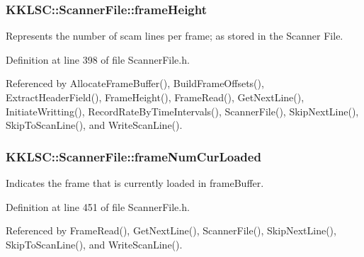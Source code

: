 \subsubsection[{\texorpdfstring{frame\+Height}{frameHeight}}]{ K\+K\+L\+S\+C\+::\+Scanner\+File\+::frame\+Height\hspace{0.3cm}{\ttfamily [protected]}}\hypertarget{class_k_k_l_s_c_1_1_scanner_file_a5598193d137fb79782cc1967ec830625}{}\label{class_k_k_l_s_c_1_1_scanner_file_a5598193d137fb79782cc1967ec830625}
Represents the number of scam lines per frame; as stored in the Scanner File. 

Definition at line 398 of file Scanner\+File.\+h.



Referenced by Allocate\+Frame\+Buffer(), Build\+Frame\+Offsets(), Extract\+Header\+Field(), Frame\+Height(), Frame\+Read(), Get\+Next\+Line(), Initiate\+Writting(), Record\+Rate\+By\+Time\+Intervals(), Scanner\+File(), Skip\+Next\+Line(), Skip\+To\+Scan\+Line(), and Write\+Scan\+Line().

\subsubsection[{\texorpdfstring{frame\+Num\+Cur\+Loaded}{frameNumCurLoaded}}]{ K\+K\+L\+S\+C\+::\+Scanner\+File\+::frame\+Num\+Cur\+Loaded\hspace{0.3cm}{\ttfamily [protected]}}\hypertarget{class_k_k_l_s_c_1_1_scanner_file_a5af64c395493b5864d2c90f4de2677cf}{}\label{class_k_k_l_s_c_1_1_scanner_file_a5af64c395493b5864d2c90f4de2677cf}
Indicates the frame that is currently loaded in \textquotesingle{}frame\+Buffer\textquotesingle{}. 

Definition at line 451 of file Scanner\+File.\+h.



Referenced by Frame\+Read(), Get\+Next\+Line(), Scanner\+File(), Skip\+Next\+Line(), Skip\+To\+Scan\+Line(), and Write\+Scan\+Line().

